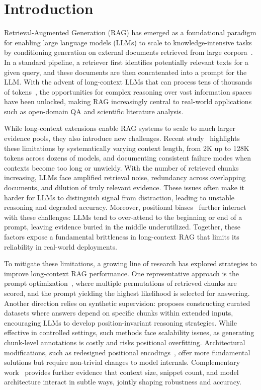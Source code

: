 \documentclass{article} %
\begin{document}
\section{Introduction}
Retrieval-Augmented Generation (RAG) has emerged as a foundational paradigm for enabling large language models (LLMs) to scale to knowledge-intensive tasks by conditioning generation on external documents retrieved from large corpora~\citep{lewis2020retrieval, borgeaud2022improving}. In a standard pipeline, a retriever first identifies potentially relevant texts for a given query, and these documents are then concatenated into a prompt for the LLM. With the advent of long-context LLMs that can process tens of thousands of tokens~\citep{DBLP:conf/iclr/XiaoTCHL24,DBLP:conf/iclr/0008PWM0LSBSC24}, 
the opportunities for complex reasoning over vast information spaces have been unlocked, making RAG increasingly central to real-world applications such as open-domain QA and scientific literature analysis.

While long-context extensions enable RAG systems to scale to much larger evidence pools, they also introduce new challenges. Recent study~\citep{leng2024long} highlights these limitations by systematically varying context length, from 2K up to 128K tokens across dozens of models, and documenting consistent failure modes when contexts become too long or unwieldy. With the number of retrieved chunks increasing, LLMs face amplified retrieval noise, redundancy across overlapping documents, and dilution of truly relevant evidence. These issues often make it harder for LLMs to distinguish signal from distraction, leading to unstable reasoning and degraded accuracy. Moreover, positional biases~\citep{DBLP:journals/tacl/LiuLHPBPL24,zhangfound} further interact with these challenges: LLMs tend to over-attend to the beginning or end of a prompt, leaving evidence buried in the middle underutilized. Together, these factors expose a fundamental brittleness in long-context RAG that limits its reliability in real-world deployments.

To mitigate these limitations, a growing line of research has explored strategies to improve long-context RAG performance. One representative approach is the prompt optimization~\citep{liu2024likelihood}, where multiple permutations of retrieved chunks are scored, and the prompt yielding the highest likelihood is selected for answering. Another direction relies on synthetic supervision: \citet{an2024make} proposes constructing curated datasets where answers depend on specific chunks within extended inputs, encouraging LLMs to develop position-invariant reasoning strategies. While effective in controlled settings, such methods face scalability issues, as generating chunk-level annotations is costly and risks positional overfitting. Architectural modifications, such as redesigned positional encodings~\citep{zhangfound}, offer more fundamental solutions but require non-trivial changes to model internals. Complementary work~\citep{vladika2025influence} provides further evidence that context size, snippet count, and model architecture interact in subtle ways, jointly shaping robustness and accuracy.
\end{document}
